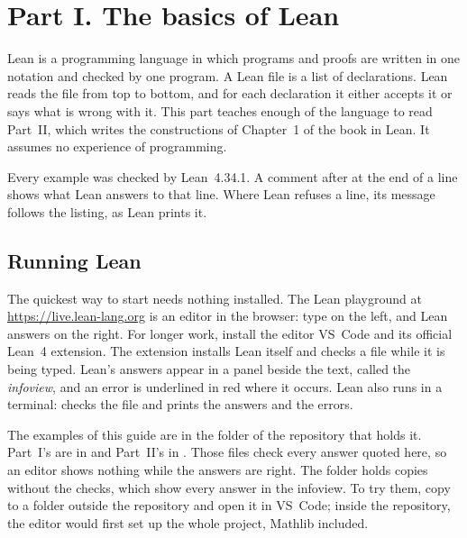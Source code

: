 \chapter*{Part I. The basics of Lean}

Lean is a programming language in which programs and proofs are written in
one notation and checked by one program. A Lean file is a list of
declarations. Lean reads the file from top to bottom, and for each
declaration it either accepts it or says what is wrong with it. This part
teaches enough of the language to read Part~II, which writes the
constructions of Chapter~1 of the book in Lean. It assumes no experience of
programming.

Every example was checked by Lean~4.34.1. A comment after \lc{-{}-} at the
end of a line shows what Lean answers to that line. Where Lean refuses a line,
its message follows the listing, as Lean prints it.

\section*{Running Lean}

The quickest way to start needs nothing installed. The Lean playground at
\url{https://live.lean-lang.org} is an editor in the browser: type on the
left, and Lean answers on the right. For longer work, install the editor
VS~Code and its official Lean~4 extension. The extension installs Lean
itself and checks a file while it is being typed. Lean's answers appear in a
panel beside the text, called the \emph{infoview}, and an error is
underlined in red where it occurs. Lean also runs in a terminal:
 checks the file  and prints the answers
and the errors.

The examples of this guide are in the folder  of the
repository that holds it. Part~I's are in  and
Part~II's in . Those files check every answer
quoted here, so an editor shows nothing while the answers are right. The
folder  holds copies without the checks, which show every answer
in the infoview. To try them, copy  to a folder outside the
repository and open it in VS~Code; inside the repository, the editor would
first set up the whole project, Mathlib included.

